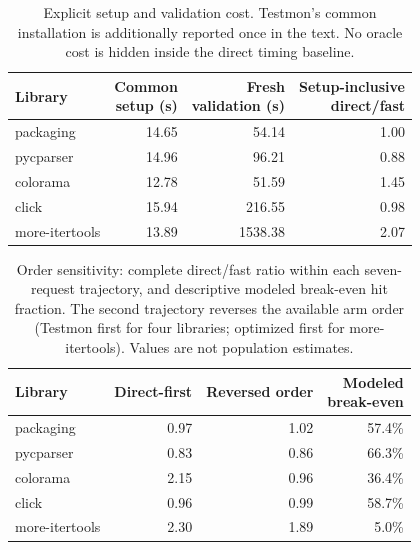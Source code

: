 \begin{table}[htbp]
\caption{Explicit setup and validation cost. Testmon's common installation is additionally reported once in the text. No oracle cost is hidden inside the direct timing baseline.}\label{tab:setup}
\small
\begin{tabular}{@{}lrrr@{}}
\toprule
Library & \shortstack{Common\\setup (s)} & \shortstack{Fresh\\validation (s)} & \shortstack{Setup-inclusive\\direct/fast} \\
\midrule
packaging & 14.65 & 54.14 & 1.00 \\
pycparser & 14.96 & 96.21 & 0.88 \\
colorama & 12.78 & 51.59 & 1.45 \\
click & 15.94 & 216.55 & 0.98 \\
more-itertools & 13.89 & 1538.38 & 2.07 \\
\bottomrule
\end{tabular}
\end{table}

\begin{table}[htbp]
\caption{Order sensitivity: complete direct/fast ratio within each seven-request trajectory, and descriptive modeled break-even hit fraction. The second trajectory reverses the available arm order (Testmon first for four libraries; optimized first for more-itertools). Values are not population estimates.}\label{tab:order}
\small
\begin{tabular}{@{}lrrr@{}}
\toprule
Library & Direct-first & Reversed order & \shortstack{Modeled\\break-even} \\
\midrule
packaging & 0.97 & 1.02 & 57.4\% \\
pycparser & 0.83 & 0.86 & 66.3\% \\
colorama & 2.15 & 0.96 & 36.4\% \\
click & 0.96 & 0.99 & 58.7\% \\
more-itertools & 2.30 & 1.89 & 5.0\% \\
\bottomrule
\end{tabular}
\end{table}
